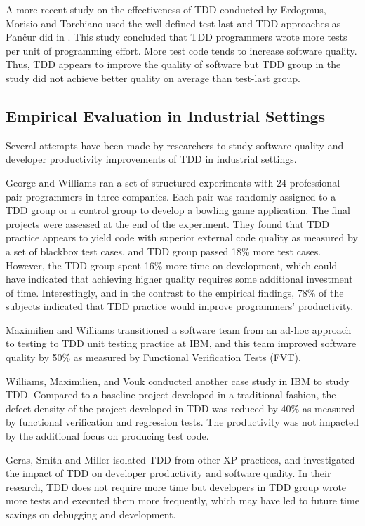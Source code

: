 A more recent study on the effectiveness of TDD conducted by Erdogmus,
Morisio and Torchiano \cite{Erdogmus:05} used the well-defined test-last
and TDD approaches as Pan\v{c}ur did in \cite{Matjaz:03}. This study 
concluded that TDD programmers wrote more tests per unit of programming 
effort. More test code tends to increase software quality. Thus, TDD appears 
to improve the quality of software but TDD group in the study did not 
achieve better quality on average than test-last group. 

\subsection{Empirical Evaluation in Industrial Settings}
Several attempts have been made by researchers to study software quality
and developer productivity improvements of TDD in industrial settings.  

George and Williams \cite{George:04} ran a set of structured experiments
with 24 professional pair programmers in three companies. Each pair was
randomly assigned to a TDD group or a control group to develop a bowling
game application. The final projects were assessed at the end of the
experiment.  They found that TDD practice appears to yield code with
superior external code quality as measured by a set of blackbox test cases,
and TDD group passed 18\% more test cases. However, the TDD group spent
16\% more time on development, which could have indicated that achieving
higher quality requires some additional investment of time. Interestingly,
and in the contrast to the empirical findings, 78\% of the subjects
indicated that TDD practice would improve programmers' productivity.

Maximilien and Williams \cite{Maximilien:03} transitioned a software team
from an ad-hoc approach to testing to TDD unit testing practice at IBM, and
this team improved software quality by 50\% as measured by Functional
Verification Tests (FVT).

Williams, Maximilien, and Vouk \cite{Williams:03} conducted another case
study in IBM to study TDD. Compared to a baseline project developed in a 
traditional fashion, the defect density of the project developed 
in TDD was reduced by 40\% as measured by functional verification and 
regression tests. The productivity was not impacted by the additional 
focus on producing test code. 

Geras, Smith and Miller \cite{Geras:04} isolated TDD from other XP
practices, and investigated the impact of TDD on developer productivity and
software quality. In their research, TDD does not require more time but
developers in TDD group wrote more tests and executed them more frequently,
which may have led to future time savings on debugging and development.

